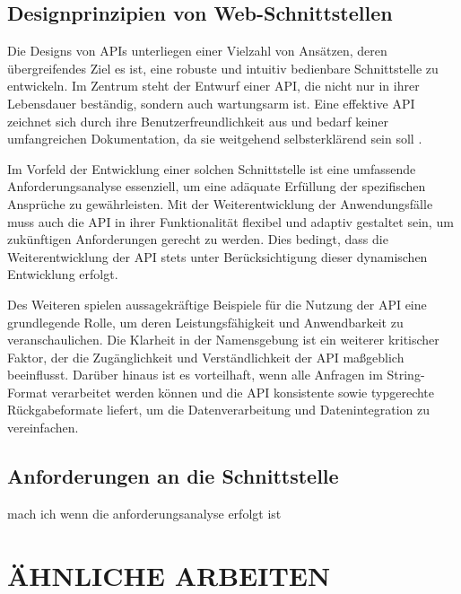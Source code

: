 \documentclass[draft,final]{vutinfth} %
\begin{document}
\section{Designprinzipien von Web-Schnittstellen}

Die Designs von APIs unterliegen einer Vielzahl von Ansätzen, deren übergreifendes Ziel es ist, eine robuste und intuitiv bedienbare Schnittstelle zu entwickeln. 
Im Zentrum steht der Entwurf einer API, die nicht nur in ihrer Lebensdauer beständig, sondern auch wartungsarm ist. 
Eine effektive API zeichnet sich durch ihre Benutzerfreundlichkeit aus und bedarf keiner umfangreichen Dokumentation, da sie weitgehend selbsterklärend sein soll \cite{Bloch:2006:How2DesignGoodAPI}.

Im Vorfeld der Entwicklung einer solchen Schnittstelle ist eine umfassende Anforderungsanalyse essenziell, um eine adäquate Erfüllung der spezifischen Ansprüche zu gewährleisten. 
Mit der Weiterentwicklung der Anwendungsfälle muss auch die API in ihrer Funktionalität flexibel und adaptiv gestaltet sein, um zukünftigen Anforderungen gerecht zu werden. 
Dies bedingt, dass die Weiterentwicklung der API stets unter Berücksichtigung dieser dynamischen Entwicklung erfolgt. \cite{Bloch:2006:How2DesignGoodAPI}

Des Weiteren spielen aussagekräftige Beispiele für die Nutzung der API eine grundlegende Rolle, um deren Leistungsfähigkeit und Anwendbarkeit zu veranschaulichen. 
Die Klarheit in der Namensgebung ist ein weiterer kritischer Faktor, der die Zugänglichkeit und Verständlichkeit der API maßgeblich beeinflusst. Darüber hinaus ist es vorteilhaft, wenn alle Anfragen im String-Format verarbeitet werden können und die API konsistente sowie typgerechte Rückgabeformate liefert, um die Datenverarbeitung und Datenintegration zu vereinfachen. \cite{Bloch:2006:How2DesignGoodAPI}


\section{Anforderungen an die Schnittstelle}

mach ich wenn die anforderungsanalyse erfolgt ist












\chapter{ÄHNLICHE ARBEITEN}
\end{document}
